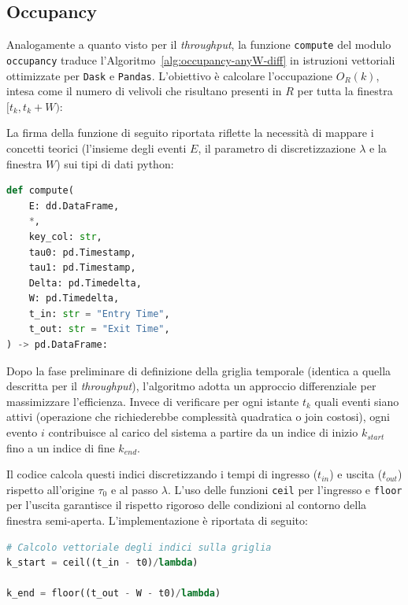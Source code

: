 \subsection{Occupancy}
Analogamente a quanto visto per il \emph{throughput}, la funzione \texttt{compute} del modulo \texttt{occupancy} traduce l'Algoritmo~\ref{alg:occupancy-anyW-diff} in istruzioni vettoriali ottimizzate per \texttt{Dask} e \texttt{Pandas}.
L'obiettivo è calcolare l'occupazione $O_R(k)$, intesa come il numero di velivoli che risultano presenti in \(R\) per tutta la finestra $[t_k, t_k + W)$:

La firma della funzione di seguito riportata riflette la necessità di mappare i concetti teorici (l'insieme degli eventi $E$, il parametro di discretizzazione $\lambda$ e la finestra $W$) sui tipi di dati \gls{python}:
\clearpage

\begin{lstlisting}[language=Python, caption={}]
def compute(
    E: dd.DataFrame,
    *,
    key_col: str,
    tau0: pd.Timestamp,
    tau1: pd.Timestamp,
    Delta: pd.Timedelta,
    W: pd.Timedelta,
    t_in: str = "Entry Time",
    t_out: str = "Exit Time",
) -> pd.DataFrame:
\end{lstlisting}

Dopo la fase preliminare di definizione della griglia temporale (identica a quella descritta per il \emph{throughput}), l'algoritmo adotta un approccio differenziale per massimizzare l'efficienza. Invece di verificare per ogni istante $t_k$ quali eventi siano attivi (operazione che richiederebbe complessità quadratica o join costosi), ogni evento $i$ contribuisce al carico del sistema a partire da un indice di inizio $k_{start}$ fino a un indice di fine $k_{end}$.

Il codice calcola questi indici discretizzando i tempi di ingresso ($t_{in}$) e uscita ($t_{out}$) rispetto all'origine $\tau_0$ e al passo $\lambda$. L'uso delle funzioni \texttt{ceil} per l'ingresso e \texttt{floor} per l'uscita garantisce il rispetto rigoroso delle condizioni al contorno della finestra semi-aperta. L'implementazione è riportata di seguito:

\begin{lstlisting}[language=Python, caption={}]
# Calcolo vettoriale degli indici sulla griglia
k_start = ceil((t_in - t0)/lambda)

k_end = floor((t_out - W - t0)/lambda)

\end{lstlisting}

